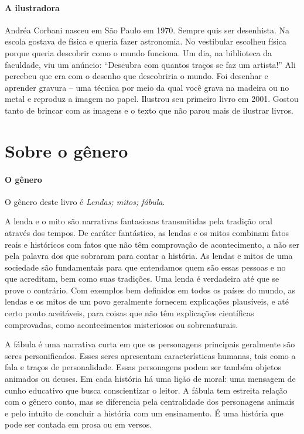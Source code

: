 \documentclass[11pt]{extarticle}
\begin{document}
\paragraph{A ilustradora} Andréa Corbani nasceu em São Paulo em 1970. Sempre
quis ser desenhista. Na escola gostava de física e queria fazer astronomia. No vestibular escolheu física porque queria descobrir como o mundo funciona. Um dia, na biblioteca
da faculdade, viu um anúncio: “Descubra com quantos traços se faz um artista!” Ali percebeu que era com o desenho que descobriria o mundo. Foi desenhar e aprender gravura – uma técnica por meio da qual você grava na madeira ou no metal e reproduz a imagem no papel. Ilustrou seu primeiro livro em 2001. Gostou tanto de brincar com as imagens e o texto que não parou mais de ilustrar livros.



\section{Sobre o gênero}

\paragraph{O gênero} O gênero deste livro é \textit{Lendas; mitos; fábula}. 

A lenda e o mito são narrativas fantasiosas transmitidas pela tradição oral através dos tempos. De caráter fantástico, as lendas e os mitos combinam fatos reais e históricos com fatos que não têm comprovação de acontecimento, a não ser pela palavra dos que sobraram para contar a história. As lendas e mitos de uma sociedade são fundamentais para que entendamos quem são essas pessoas e no que acreditam, bem como suas tradições. Uma lenda é verdadeira até que se prove o contrário. Com exemplos bem definidos em todos os países do mundo, as lendas e os mitos de um povo geralmente fornecem explicações plausíveis, e até certo ponto aceitáveis, para coisas que não têm explicações científicas comprovadas, como acontecimentos misteriosos ou sobrenaturais.

A fábula é uma narrativa curta em que os personagens principais geralmente são seres personificados. Esses seres apresentam características humanas, tais como a fala e traços de personalidade. Essas personagens podem ser também objetos animados ou deuses. Em cada história há uma lição de moral: uma mensagem de cunho educativo que busca conscientizar o leitor. A fábula tem estreita relação com o gênero conto, mas se diferencia pela centralidade dos personagens animais e pelo intuito de concluir a história com um ensinamento. É uma história que pode ser contada em prosa ou em versos. 
\end{document}
